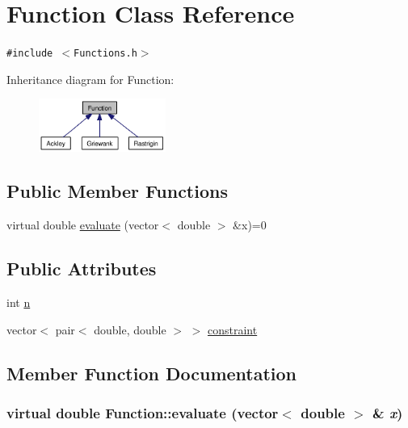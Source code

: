 \hypertarget{classFunction}{
\section{Function Class Reference}
\label{classFunction}
}
{\tt \#include $<$Functions.h$>$}

Inheritance diagram for Function:\nopagebreak
\begin{figure}[H]
\begin{center}
\leavevmode
\includegraphics[width=118pt]{classFunction__inherit__graph}
\end{center}
\end{figure}
\subsection*{Public Member Functions}
\begin{CompactItemize}
\item 
virtual double \hyperlink{classFunction_9323a7309b16e0e168590e34b359ff32}{evaluate} (vector$<$ double $>$ \&x)=0
\end{CompactItemize}
\subsection*{Public Attributes}
\begin{CompactItemize}
\item 
int \hyperlink{classFunction_2f582d2da9cb2af5507a55e17bc44083}{n}
\item 
vector$<$ pair$<$ double, double $>$ $>$ \hyperlink{classFunction_e846ed04f4211984a2162b620ee91c81}{constraint}
\end{CompactItemize}


\subsection{Member Function Documentation}
\hypertarget{classFunction_9323a7309b16e0e168590e34b359ff32}{
\subsubsection{\setlength{\rightskip}{0pt plus 5cm}virtual double Function::evaluate (vector$<$ double $>$ \& {\em x})}}
\label{classFunction_9323a7309b16e0e168590e34b359ff32}




